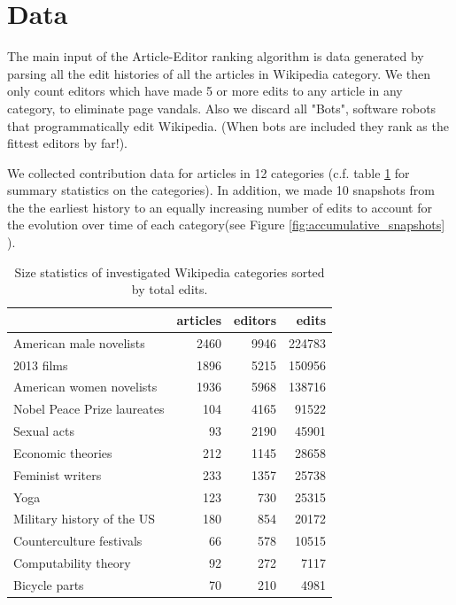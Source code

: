 \section{Data}
The main input of the Article-Editor ranking algorithm is data generated by parsing all the edit histories of all the articles in Wikipedia category. We then only count editors which have made 5 or more edits to any article in any category, to eliminate page vandals. Also we discard all "Bots", software robots that programmatically edit Wikipedia. (When bots are included they rank as the fittest editors by far!).

We collected contribution data for articles in 12 categories (c.f. table \ref{tab:statistics} for summary statistics on the categories). In addition, we made 10 snapshots from the the earliest history to an equally increasing number of edits to account for the evolution over time of each category(see Figure \ref{fig:accumulative_snapshots} ).

\begin{table}
\begin{tabular}{lrrr}
\toprule
{} &  articles &  editors &   edits \\
\midrule
American male novelists               &      2460 &   9946 &  224783 \\
2013 films                            &      1896 &   5215 &  150956 \\
American women novelists              &      1936 &   5968 &  138716 \\
Nobel Peace Prize laureates           &       104 &   4165 &   91522 \\
Sexual acts                           &        93 &   2190 &   45901 \\
Economic theories                     &       212 &   1145 &   28658 \\
Feminist writers                      &       233 &   1357 &   25738 \\
Yoga                                  &       123 &    730 &   25315 \\
Military history of the US &       180 &    854 &   20172 \\
Counterculture festivals              &        66 &    578 &   10515 \\
Computability theory                  &        92 &    272 &    7117 \\
Bicycle parts                         &        70 &    210 &    4981 \\
\bottomrule
\end{tabular}
\caption{Size statistics of investigated Wikipedia categories sorted by total edits.}
\label{tab:statistics}
\end{table}

